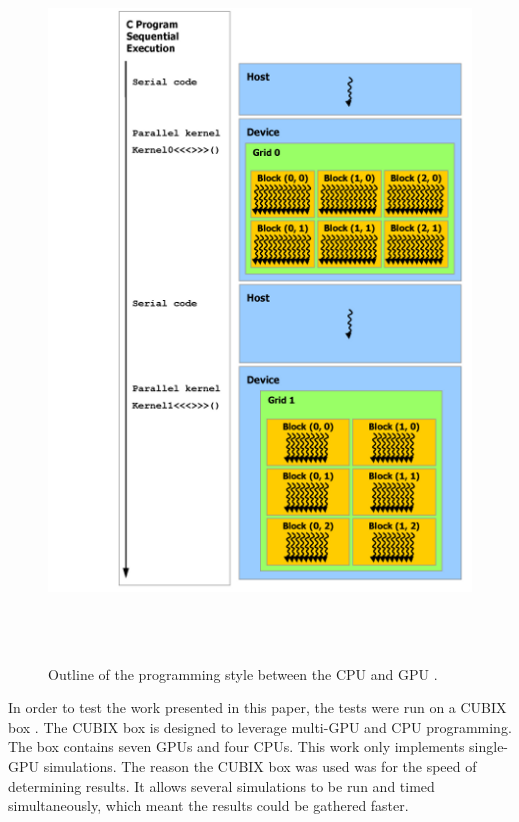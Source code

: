 \begin{figure}%
\centering
\includegraphics[height=7.5in]{figures/background/cuda_arch.png}
\caption{Outline of the programming style between the CPU and GPU \cite{cuda}.}
\label{fig:cuda_arch}
\end{figure}

In order to test the work presented in this paper, the tests were run on a CUBIX box \cite{cubix}. The CUBIX box is designed to leverage multi-GPU and CPU programming. The box contains seven GPUs and four CPUs. This work only implements single-GPU simulations. The reason the CUBIX box was used was for the speed of determining results. It allows several simulations to be run and timed simultaneously, which meant the results could be gathered faster. 

